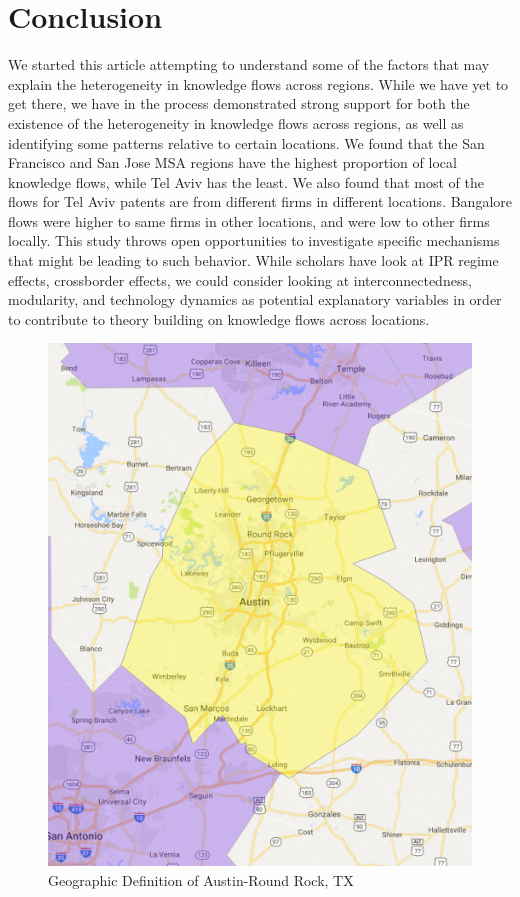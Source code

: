 \documentclass[12pt]{article}
\begin{document}
\section{Conclusion}
We started this article attempting to understand some of the factors that may explain the heterogeneity in knowledge flows across regions. While we have yet to get there, we have in the process demonstrated strong support for both the existence of the heterogeneity in knowledge flows across regions, as well as identifying some patterns relative to certain locations. We found that the San Francisco and San Jose MSA regions have the highest proportion of local knowledge flows, while Tel Aviv has the least. We also found that most of the flows for Tel Aviv patents are from different firms in different locations. Bangalore flows were higher to same firms in other locations, and were low to other firms locally. This study throws open opportunities to investigate specific mechanisms that might be leading to such behavior. While scholars have look at IPR regime effects, crossborder effects, we could consider looking at interconnectedness, modularity, and technology dynamics as potential explanatory variables in order to contribute to theory building on knowledge flows across locations.
\newpage


\begin{figure}[h]
\begin{centering}
  \includegraphics[width=\textwidth]{Austin}
  \caption{Geographic Definition of Austin-Round Rock, TX}
   \label{fig:Austin}
\end{centering}
\end{figure}
\end{document}
